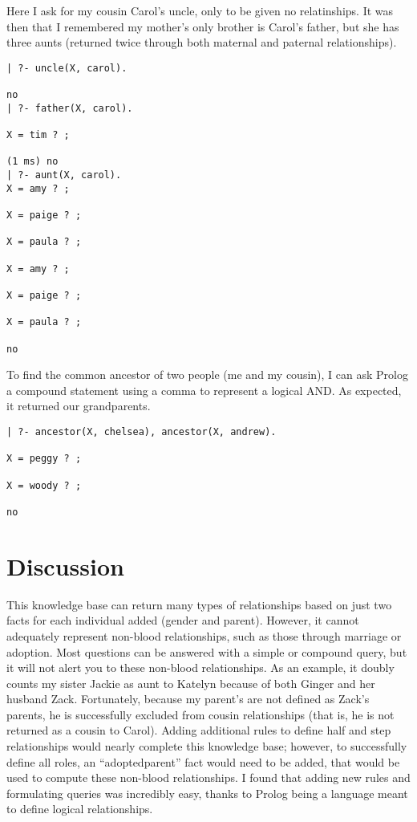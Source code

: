 \documentclass[12pt, article]{scrartcl}
\begin{document}
Here I ask for my cousin Carol's uncle, only to be given no relatinships. It was then that I remembered my mother's only brother is Carol's father, but she has three aunts (returned twice through both maternal and paternal relationships).
\begin{verbatim}
| ?- uncle(X, carol).

no
| ?- father(X, carol).

X = tim ? ;

(1 ms) no
| ?- aunt(X, carol).
X = amy ? ;

X = paige ? ;

X = paula ? ;

X = amy ? ;

X = paige ? ;

X = paula ? ;

no
\end{verbatim}

To find the common ancestor of two people (me and my cousin), I can ask Prolog a compound statement using a comma to represent a logical AND. As expected, it returned our grandparents.
\begin{verbatim}
| ?- ancestor(X, chelsea), ancestor(X, andrew).

X = peggy ? ;

X = woody ? ;

no
\end{verbatim}
\section{Discussion}
This knowledge base can return many types of relationships based on just two facts for each individual added (gender and parent). However, it cannot adequately represent non-blood relationships, such as those through marriage or adoption. Most questions can be answered with a simple or compound query, but it will not alert you to these non-blood relationships. As an example, it doubly counts my sister Jackie as aunt to Katelyn because of both Ginger and her husband Zack. Fortunately, because my parent's are not defined as Zack's parents, he is successfully excluded from cousin relationships (that is, he is not returned as a cousin to Carol). Adding additional rules to define half and step relationships would nearly complete this knowledge base; however, to successfully define all roles, an ``adoptedparent'' fact would need to be added, that would be used to compute these non-blood relationships. I found that adding new rules and formulating queries was incredibly easy, thanks to Prolog being a language meant to define logical relationships.
\end{document}
